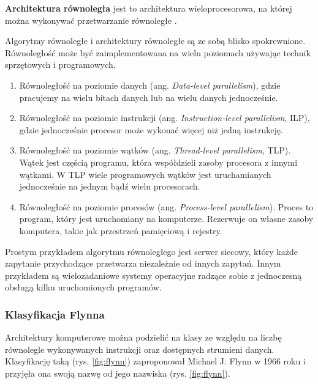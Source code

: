 \begin{definicja}\label{def:arch_rownolegla}
\textbf{Architektura równoległa} jest to architektura wieloprocesorowa, na której można wykonywać przetwarzanie równoległe \cite{IEEE}.
\end{definicja}

Algorytmy równoległe i architektury równoległe są ze sobą blisko spokrewnione. Równoległość może być zaimplementowana na wielu poziomach używając technik sprzętowych i programowych.
\begin{enumerate}
\item{Równoległość na poziomie danych (ang. \emph{Data-level parallelism}), gdzie pracujemy na wielu bitach danych lub na wielu danych jednocześnie.}
\item{Równoległość na poziomie instrukcji (ang. \emph{Instruction-level parallelism}, ILP), gdzie jednocześnie procesor może wykonać więcej niż jedną instrukcję.}
\item{Równoległość na poziomie wątków (ang. \emph{Thread-level parallelism}, TLP). Wątek jest częścią programu, która współdzieli zasoby procesora z innymi wątkami. W TLP wiele programowych wątków jest uruchamianych jednocześnie na jednym bądź wielu procesorach.}
\item{Równoległość na poziomie procesów (ang. \emph{Process-level parallelism}). Proces to program, który jest uruchomiany na komputerze. Rezerwuje on własne zasoby komputera, takie jak przestrzeń pamięciową i rejestry.\cite{APC2011}}
\end{enumerate}

\begin{przyklad}
Prostym przykładem algorytmu równoległego jest serwer siecowy, który każde zapytanie przychodzące przetwarza niezależnie od innych zapytań. Innym przykładem są wielozadaniowe systemy operacyjne radzące sobie z jednoczesną obsługą kilku uruchomionych programów.
\end{przyklad}

\subsubsection{Klasyfikacja Flynna}
Architektury komputerowe można podzielić na klasy ze względu na liczbę równolegle wykonywanych instrukcji oraz dostępnych strumieni danych. Klasyfikację taką (rys. \ref{fig:flynn}) zaproponował Michael J. Flynn w 1966 roku i przyjęła ona swoją nazwę od jego nazwiska (rys. \ref{fig:flynn}).

